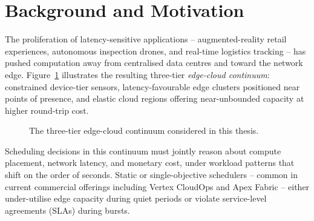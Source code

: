 \section{Background and Motivation}
The proliferation of latency-sensitive applications -- augmented-reality retail experiences, autonomous inspection drones, and real-time logistics tracking -- has pushed computation away from centralised data centres and toward the network edge. Figure~\ref{fig:continuum} illustrates the resulting three-tier \emph{edge-cloud continuum}: constrained device-tier sensors, latency-favourable edge clusters positioned near points of presence, and elastic cloud regions offering near-unbounded capacity at higher round-trip cost.

\begin{figure}[htb]
\centering
{}
\caption{The three-tier edge-cloud continuum considered in this thesis.}
\label{fig:continuum}
\end{figure}

Scheduling decisions in this continuum must jointly reason about compute placement, network latency, and monetary cost, under workload patterns that shift on the order of seconds. Static or single-objective schedulers -- common in current commercial offerings including Vertex CloudOps and Apex Fabric -- either under-utilise edge capacity during quiet periods or violate service-level agreements (SLAs) during bursts.
